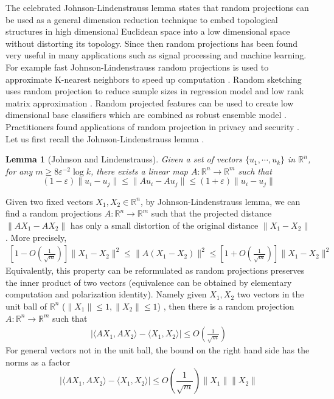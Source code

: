 \documentclass[12pt]{extarticle}
\newtheorem{lemma}[other]{Lemma}
\newcommand{\field}[1]{\mathbb{#1}}
\newcommand{\R}{\field{R}}
\newcommand{\1}{\field{1}}
\numberwithin{equation}{section}
\begin{document}
     The celebrated Johnson-Lindenstrauss lemma \cite{johnson1984extensions} states that random projections can be used as a general dimension reduction technique to embed topological structures in high dimensional Euclidean space into a low dimensional space without distorting its topology. 
     Since then random projections has been found very useful in many applications such as signal processing and machine learning.  For example fast Johnson-Lindenstrauss random projections is used to approximate K-nearest neighbors to speed up computation \cite{indyk1998approximate, ailon2009fast}.  Random sketching uses random projection to reduce sample sizes in regression model and low rank matrix approximation \cite{woodruff2014sketching}. Random projected features can be used to create low dimensional base classifiers which are combined as robust ensemble model \cite{cannings2017random}. Practitioners found applications of random projection in privacy and security \cite{liu2005random}.
Let us first recall the Johnson-Lindenstrauss lemma \cite{burr2018optimal}.
  \begin{lemma}[Johnson and Lindenstrauss]\label{lemma:Johnson-Lindenstrauss lemma}
       Given a set of vectors $\{u_1, \cdots, u_k\}$ in $\R^n$, for any $m \ge 8 \varepsilon^{-2} \log k$, there exists a linear map $A:\R^n \to \R^m$ such that 
       \[
       (1-\varepsilon)\|u_i -u_j\| \le 
       \|Au_i -Au_j\| \le (1+\varepsilon)\|u_i -u_j\|
       \]
  \end{lemma}
  
  Given two fixed vectors $X_1, X_2 \in \R^n$,  by Johnson-Lindenstrauss lemma,  we can find a random projections $A: \R^n \to \R^m$ such that the projected distance $\|AX_1-AX_2 \|$ has only a small distortion of the original distance $\|X_1-X_2 \|$. More precisely, 
\begin{align}\label{eqn:J-L lemma norm error order}
    \left[1- O(\frac{1}{\sqrt{m}}) \right] \|X_1-X_2\|^2 \le \| A(X_1-X_2)\|^2 \le \left[1+ O(\frac{1}{\sqrt{m}}) \right] \|X_1-X_2\|^2
\end{align}
Equivalently, this property can be reformulated as random projections preserves the inner product of two vectors (equivalence can be obtained by elementary computation and polarization identity). %
Namely given $X_1, X_2$ two vectors in the unit ball of $\R^n$ ($\|X_1\|\le 1, \|X_2\|\le 1$) , then there is a random projection $A:\R^n \to \R^m$ such that 
\begin{align}\label{eqn:J-L lemma inner product}
    | \langle AX_1, AX_2 \rangle - \langle X_1, X_2 \rangle | \le O(\frac{1}{\sqrt{m}})
\end{align}
For general vectors not in the unit ball, the bound on the right hand side has the norms as a factor \[
| \langle AX_1, AX_2 \rangle - \langle X_1, X_2 \rangle | \le O(\frac{1}{\sqrt{m}})\|X_1\| \|X_2\|
\]
\end{document}
